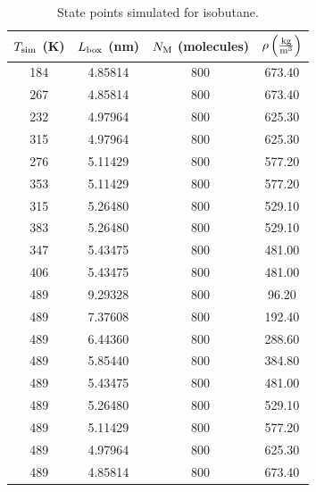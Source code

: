 \documentclass[journal=jctc,manuscript=article]{achemso}
\begin{document}
\begin{table}[p!]
	\caption{State points simulated for isobutane.} \label{tab:IC4H10 state points}
	\begin{center}
		\begin{tabular}{|c|c|c|c|}
			\hline
			$T_{\rm sim}$ (K) & $L_{\rm box}$ (nm) & $N_{\rm M}$ (molecules) & $\rho \left(\frac{\rm kg}{\rm m^3}\right)$ \\ \hline
			184 & 4.85814 & 800 & 673.40 \\
			267 & 4.85814 & 800 & 673.40 \\
			232 & 4.97964 & 800 & 625.30 \\
			315 & 4.97964 & 800 & 625.30 \\
			276 & 5.11429 & 800 & 577.20 \\
			353 & 5.11429 & 800 & 577.20 \\
			315 & 5.26480 & 800 & 529.10 \\
			383 & 5.26480 & 800 & 529.10 \\
			347 & 5.43475 & 800 & 481.00 \\
			406 & 5.43475 & 800 & 481.00 \\
			489 & 9.29328 & 800 & 96.20  \\
			489 & 7.37608 & 800 & 192.40 \\
			489 & 6.44360 & 800 & 288.60 \\
			489 & 5.85440 & 800 & 384.80 \\
			489 & 5.43475 & 800 & 481.00 \\
			489 & 5.26480 & 800 & 529.10 \\
			489 & 5.11429 & 800 & 577.20 \\
			489 & 4.97964 & 800 & 625.30 \\
			489 & 4.85814 & 800 & 673.40 \\
			\hline
		\end{tabular}
	\end{center}
\end{table}
\end{document}
